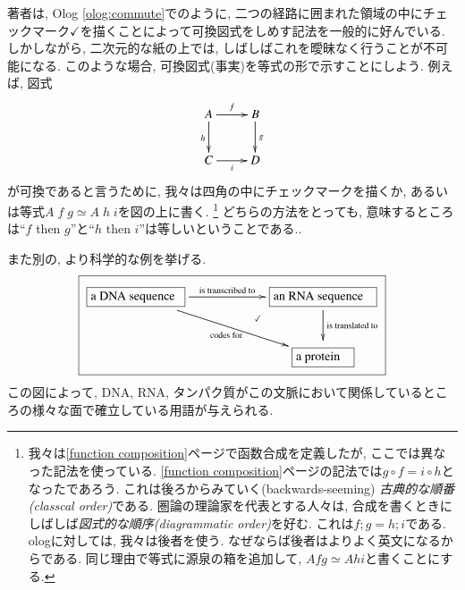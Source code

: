 著者は, Olog \eqref{olog:commute}でのように, 二つの経路に囲まれた領域の中にチェックマーク$\checkmark$を描くことによって可換図式をしめす記法を一般的に好んでいる. しかしながら, 二次元的な紙の上では, しばしばこれを曖昧なく行うことが不可能になる. このような場合, 可換図式(事実)を等式の形で示すことにしよう. 例えば, 図式$$\xymatrix{A\ar[r]^f\ar[d]_h&B\ar[d]^g\\C\ar[r]_i&D}$$が可換であると言うために, 我々は四角の中にチェックマークを描くか, あるいは等式$A\;f\;g\simeq A\;h\;i$を図の上に書く.
\footnote{我々は\ref{function composition}ページで函数合成を定義したが, ここでは異なった記法を使っている. \eqref{function composition}ページの記法では$g\circ f = i\circ h$となったであろう. これは後ろからみていく(backwards-seeming) \emph{古典的な順番(classcal order)}である. 圏論の理論家を代表とする人々は, 合成を書くときにしばしば\emph{図式的な順序(diagrammatic order)}を好む. これは$f;g=h;i$である. ologに対しては, 我々は後者を使う. なぜならば後者はよりよく英文になるからである. 同じ理由で等式に源泉の箱を追加して, $A f g \simeq A h i$と書くことにする.
}
どちらの方法をとっても, 意味するところは``$f$ then $g$''と``$h$ then $i$''は等しいということである..  


また別の, より科学的な例を挙げる.
\begin{align*}
\fbox{\xymatrix{
\obox{}{1in}{a DNA sequence}\LA{rr}{is transcribed to}\LAL{drr}{codes for}&\hspace{.1in}&\obox{}{1.1in}{an RNA sequence}\ar@{}[dll]|(.35){\checkmark}\LA{d}{is translated to}\\
&&\obox{}{.6in}{a protein}}}
\end{align*}
この図によって, DNA, RNA, タンパク質がこの文脈において関係しているところの様々な面で確立している用語が与えられる.

